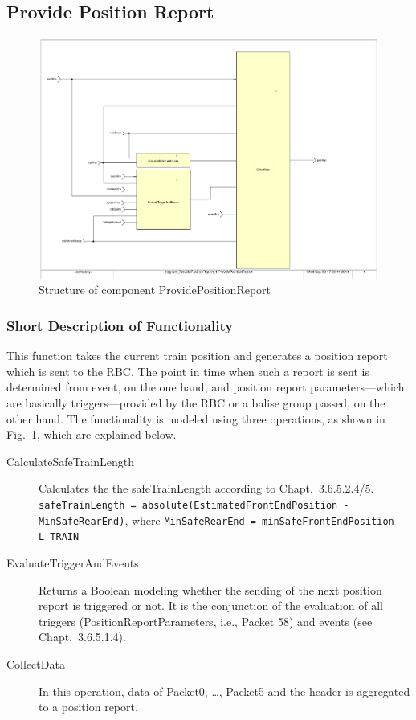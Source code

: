 \subsection{Provide Position Report}\label{sss:provposrep}

\begin{figure}[ht]
\centering
\includegraphics[width=\textwidth]{../images/ProvidePositionReport.pdf}
\caption{Structure of component ProvidePositionReport}\label{fig:provideposrep}
\end{figure}

\subsubsection{Short Description of Functionality}
This function takes the current train position and generates a position report which is sent to the RBC. The point in time when such a report is sent is determined from event, on the one hand, and position report parameters---which are basically triggers---provided by the RBC or a balise group passed, on the other hand. The functionality is modeled using three operations, as shown in Fig.~\ref{fig:provideposrep}, which are explained below.
\begin{description}
	\item[CalculateSafeTrainLength] Calculates the the safeTrainLength according to Chapt.~3.6.5.2.4/5.
\verb+safeTrainLength = absolute(EstimatedFrontEndPosition - MinSafeRearEnd)+, where
\verb+MinSafeRearEnd = minSafeFrontEndPosition - L_TRAIN+
	\item[EvaluateTriggerAndEvents] Returns a Boolean modeling whether the sending of the next position report is triggered or not. It is the conjunction of the evaluation of all triggers (PositionReportParameters, i.e., Packet 58) and events (see Chapt.~3.6.5.1.4).
	\item[CollectData] In this operation, data of Packet0, \dots, Packet5 and the header is aggregated to a position report.
\end{description}

